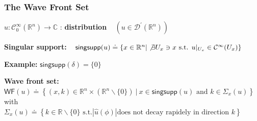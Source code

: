 \documentclass[9pt]{beamer}
\newcommand{\abs}[1]{\left|{#1}\right|} %
\renewcommand{\sup}{\mathsf{sup}} %
\newcommand{\WF}{\mathsf{WF}} %
\newcommand{\Ccal}{\mathcal{C}}
\newcommand{\Dcal}{\mathcal{D}}
\newcommand{\Cbb}{\mathbb{C}}
\newcommand{\Rbb}{\mathbb{R}}
\begin{document}
\begin{frame}[label=details_wf]

\frametitle{The Wave Front Set}

$u : \Ccal^\infty_0(\Rbb^n) \to \Cbb$ : 
\textbf{distribution} \ 
$\left(u \in \Dcal^\prime(\Rbb^n)\right)$ 





\begin{block}{\vspace*{-3ex}}
 \vspace*{-3pt}
\textbf{Singular support:} 
\
$\mathsf{singsupp}(u) \doteq \left\{ x \in \Rbb^n | \not\exists U_x \ni x \mbox{ s.t. } u|_{U_x} \in \Ccal^\infty(U_x) \right\}$
\end{block}

\textbf{Example:} $\mathsf{singsupp}(\delta) = \{0\}$

\vspace*{-12pt}

\begin{block}{\vspace*{-3ex}}
\vspace*{-3pt}
\textbf{Wave front set:} $\WF(u) \doteq \left\{ (x,k) \in \Rbb^n \times (\Rbb^n \backslash \{0\}) \ | \ x \in \mathsf{singsupp}(u) \mbox{ and } k \in \Sigma_x(u) \right\}$\\
\mbox{with } $\Sigma_x(u) \doteq \left\{ k \in \Rbb \backslash \{0\} \mbox{ s.t.} \abs{\hat{u}(\phi)} \mbox{does not decay rapidely in direction } k\right\}$



\end{block}
\end{frame}
\end{document}
